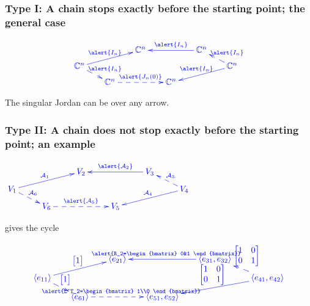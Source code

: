 \documentclass[usenames,dvipsnames]{beamer}
\begin{document}
\begin{frame}
\frametitle{Type I: A chain stops
exactly before the starting point; the
general case}\vspace{-1cm}


\[
\textcolor{blue}{\xymatrix@R=6pt@C=17pt{
&&\mathbb C^n\ar@{<-}[rr]^{\alert{I_n}}&&
\mathbb C^n\ar@{<--}[dr]^{\alert{I_n}}&\\
\mathbb C^n\ar@{->}[urr]^{\alert{I_n}}&&&&&
\mathbb C^n\ar@{->}[dll]_{\alert{I_n}}\\
&\mathbb C^n\ar@{<--}[ul]_{\alert{I_n}}&&
\mathbb C^n\ar@{<--}[ll]_{\alert{J_n(0)}}&&\\}}
\]
\bigskip
\bigskip
\bigskip



The singular Jordan can be over any
arrow.

\end{frame}


\begin{frame}



\frametitle{Type II: A chain does not
stop exactly before the starting point;
an example}


\quad$\textcolor{blue}{\xymatrix@R=6pt{
&&V_2\ar@{<-}[rr]^{\alert{\mathcal A_2}}&&
V_3\ar@{<--}[dr]^{\mathcal A_3}&\\
V_1\ar@{->}[urr]^{\mathcal A_1}&&&&&
V_4\ar@{->}[dll]_{\mathcal A_4}\\
&V_6\ar@{<--}[ul]_{\mathcal A_6}&&
V_5\ar@{<--}[ll]_{\alert{\mathcal A_5}}&&\\}} $

gives the cycle\vspace{-5mm}


\[
\textcolor{blue}{\xymatrix@R=6pt@C=17pt{
&&\langle e_{21} \rangle \ar@{<-}[rr]^{\alert{R_2=\begin{bmatrix}
   0&1
    \end{bmatrix}}}&&
\langle e_{31},e_{32} \rangle \ar@{<--}[dr]^{\begin{bmatrix}
   1&0\\0&1
    \end{bmatrix}}&\\
\langle e_{11} \rangle \ar@{->}[urr]^{{\begin{bmatrix}
   1
    \end{bmatrix}}}&&&&&
\langle e_{41}, e_{42} \rangle \ar@{->}[dll]_{\begin{bmatrix}
   1&0\\0&1
    \end{bmatrix}}\\
&\langle e_{61} \rangle \ar@{<--}[ul]_{{\begin{bmatrix}
   1
    \end{bmatrix}}}&&
\langle e_{51},e_{52} \rangle \ar@{<--}[ll]_{\alert{L^T_2=\begin{bmatrix}
   1\\0
    \end{bmatrix}}}&&\\}}
\]


\end{frame}
\end{document}
